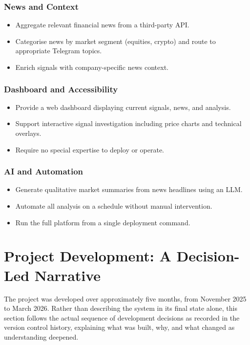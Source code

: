 \documentclass[12pt,a4paper]{article}
\begin{document}
\subsubsection*{News and Context}
\begin{itemize}[leftmargin=1.5em]
    \item Aggregate relevant financial news from a third-party API.
    \item Categorise news by market segment (equities, crypto) and route to appropriate Telegram topics.
    \item Enrich signals with company-specific news context.
\end{itemize}

\subsubsection*{Dashboard and Accessibility}
\begin{itemize}[leftmargin=1.5em]
    \item Provide a web dashboard displaying current signals, news, and analysis.
    \item Support interactive signal investigation including price charts and technical overlays.
    \item Require no special expertise to deploy or operate.
\end{itemize}

\subsubsection*{AI and Automation}
\begin{itemize}[leftmargin=1.5em]
    \item Generate qualitative market summaries from news headlines using an LLM.
    \item Automate all analysis on a schedule without manual intervention.
    \item Run the full platform from a single deployment command.
\end{itemize}

\section{Project Development: A Decision-Led Narrative}

The project was developed over approximately five months, from November 2025 to March 2026. Rather than describing the system in its final state alone, this section follows the actual sequence of development decisions as recorded in the version control history, explaining what was built, why, and what changed as understanding deepened.
\end{document}

